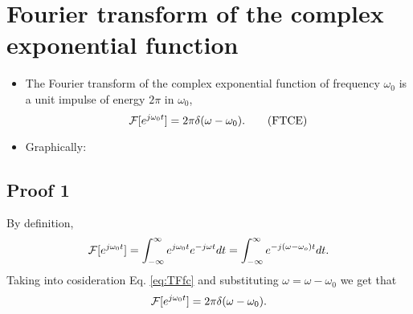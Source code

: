 \section{Fourier transform of the complex exponential function}
\begin{itemize}
\item The Fourier transform of the complex exponential function of
  frequency $\omega_0$ is a unit impulse of energy $2\pi$ in $\omega_0$,
  \begin{equation}
    {\cal F }[e^{j\omega_0t}] = 2\pi\delta(\omega-\omega_0).
    \tag{FTCE}
    \label{eq:FTCE}
  \end{equation}
\item Graphically:
\end{itemize}

\subsection*{Proof 1}
\noindent By definition,
\begin{equation*}
  {\cal F}[e^{j\omega_0t}] = \int_{-\infty}^\infty e^{j\omega_0t}e^{-j\omega t} dt =
  \int_{-\infty}^\infty e^{-j(\omega-\omega_o)t}dt.
\end{equation*}
Taking into cosideration Eq. \ref{eq:TFfc} and substituting 
$\omega=\omega-\omega_0$ we get that
\begin{equation*}
  {\cal F}[e^{j\omega_0t}] = 2\pi\delta(\omega-\omega_0).
\end{equation*}

